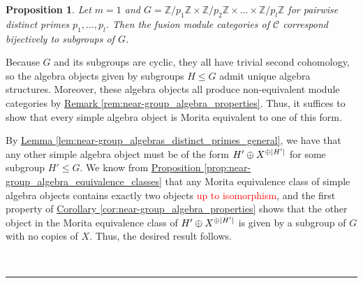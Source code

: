 \documentclass[12pt, reqno]{amsart}
\makeatletter
\def\section{\@startsection{section}{1}\z@{0pt}{0.5\linespacing}{\LARGE\scshape}}
\numberwithin{equation}{section}
\theoremstyle{plainspace}
\newtheorem{proposition}[theorem]{Proposition}
\theoremstyle{definitionspace}
\theoremstyle{remarkspace}
\renewenvironment{proof}{{\noindent\textbf{Proof.}}}{\null\hfill\qedsymbol}
\newcommand{\sectionbar}[4]{
	\noindent\\[#3\linespacing] \rule{#1\linewidth}{#2} \\[#4\linespacing]
}
\DeclarePairedDelimiter{\abs}{\lvert}{\rvert}
\newcommand{\mathcat}[1]{\mathcal{#1}}
\makeatother
\begin{document}
\begin{proposition}\label{prop:near-group_algebras_distinct_primes_special}
Let $m = 1$ and $G = \mathbb{Z}/p_1\mathbb{Z} \times \mathbb{Z}/p_2\mathbb{Z} \times \dots \times \mathbb{Z}/p_l\mathbb{Z}$ for pairwise distinct primes $p_1, \dots, p_l$. Then the fusion module categories of $\mathcat{C}$ correspond bijectively to subgroups of $G$.
\end{proposition}
\leavevmode\newline
\begin{proof}
\noindent Because $G$ and its subgroups are cyclic, they all have trivial second cohomology, so the algebra objects given by subgroups $H \leq G$ admit unique algebra structures. Moreover, these algebra objects all produce non-equivalent module categories by \hyperref[rem:near-group_algebra_properties]{Remark \ref*{rem:near-group_algebra_properties}}. Thus, it suffices to show that every simple algebra object is Morita equivalent to one of this form.
\newline

\noindent By \hyperref[lem:near-group_algebras_distinct_primes_general]{Lemma \ref*{lem:near-group_algebras_distinct_primes_general}}, we have that any other simple algebra object must be of the form $H' \oplus X^{\oplus \abs{H'}}$ for some subgroup $H' \leq G$. We know from \hyperref[prop:near-group_algebra_equivalence_classes]{Proposition \ref*{prop:near-group_algebra_equivalence_classes}} that any Morita equivalence class of simple algebra objects contains exactly two objects \textcolor{red}{up to isomorphism}, and the first property of \hyperref[cor:near-group_algebra_properties]{Corollary \ref*{cor:near-group_algebra_properties}} shows that the other object in the Morita equivalence class of $H' \oplus X^{\oplus \abs{H'}}$ is given by a subgroup of $G$ with no copies of $X$. Thus, the desired result follows.
\end{proof}
\newpage


\section{References}
\sectionbar{1}{1pt}{-2}{0}

\printbibliography[heading = none]
\end{document}
